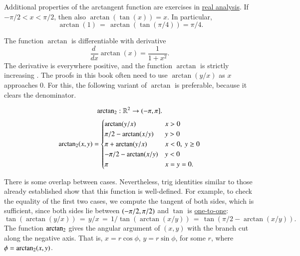 Additional properties of the arctangent function are exercises in
\hyperref[back:analysis]{real analysis}.  If $-\pi/2 < x < \pi/2$,
then also $\arctan(\tan(x)) = x$. In particular,%
\begin{equation}\label{eqn:arctan-1}\
\arctan(1) \hyperref[lemma:tan-pi4]{\,=\,} \arctan(\tan(\pi/4)) = \pi/4.
\end{equation}


The function $\arctan$ is differentiable with derivative%
\begin{equation}\label{eqn:deriv-tan}\frac{d\phantom{~}} {dx} \arctan(x) = \frac{1}{1 +
    x^2}.\end{equation}
The derivative is everywhere positive, and the function $\arctan$ is
strictly increasing \mar{\guid{LQCXGZX} increasing}.
%
The proofs in this book often need to use $\arctan(y/x)$ as  $x$ approaches $0$.
For this, the following variant of $\arctan$ is preferable, because it clears the denominator.


\begin{definition}[$\atn$]\label{def:atn}
\begin{displaymath}
{\operatorname{arctan\ensuremath{_2}}}: \mathbb{R}^2 \to (-\pi,\pi].
\end{displaymath}
\begin{displaymath}
{\operatorname{arctan\ensuremath{_2}}}(x,y) = \begin{cases}
\arctan(y/x) & x > 0\\
\pi/2- \arctan(x/y) & y > 0 \\
\pi + \arctan(y/x) & x< 0,\  y\ge 0\\
-\pi/2- \arctan(x/y) & y< 0 \\
\pi & x= y=0.\\
\end{cases}
\end{displaymath}
\end{definition}
%
%


There is some overlap between cases. Nevertheless, trig identities
similar to those already established show that this function is
well-defined.  For example, to check the equality of the first two
cases, we compute the tangent of both sides, which is sufficient,
since both sides lie between $(-\pi/2,\pi/2)$ and
$\tan$ is \hyperref[lemma:tan-monotone]{one-to-one}:
\begin{displaymath}
  \tan(\arctan(y/x)) \hyperref[def:arctan]{\,=\,} y/x \hyperref[def:arctan]{\,=\,} 
  1/\tan(\arctan(x/y)) \hyperref[lemma:cos-sin]{\,=\,} \tan(\pi/2 - \arctan(x/y)).
\end{displaymath}
The function $\atn$ gives the angular argument of $(x,y)$ with the
branch cut along the negative axis.  That is, $x = r\cos\phi$,
$y=r\sin\phi$, for some $r$, where $\phi={\operatorname{arctan_2}}(x,y)$.

